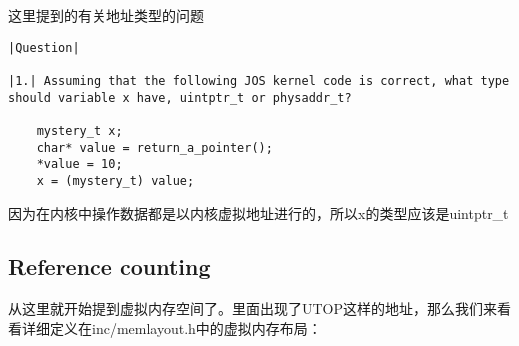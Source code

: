 \documentclass{article}
\newcommand{\funcname}[1]{{\ttfamily \small #1}}
\begin{document}
\begin{CJK*}{UTF8}{gkai}
这里提到的有关地址类型的问题

\begin{lstlisting}[style=exercise]
|Question|

|1.| Assuming that the following JOS kernel code is correct, what type should variable x have, uintptr_t or physaddr_t?

	mystery_t x;
	char* value = return_a_pointer();
	*value = 10;
	x = (mystery_t) value;
\end{lstlisting}

因为在内核中操作数据都是以内核虚拟地址进行的，所以x的类型应该是\funcname{uintptr\_t}


\subsection{Reference counting}

从这里就开始提到虚拟内存空间了。里面出现了\funcname{UTOP}这样的地址，那么我们来看看详细定义在inc/memlayout.h中的虚拟内存布局：


\end{CJK*}
\end{document}
